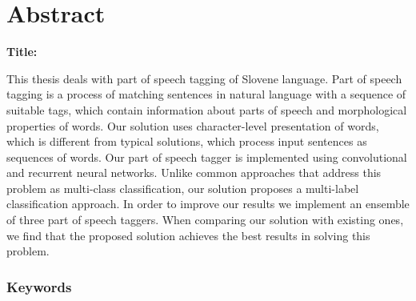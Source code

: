 \chapter*{Abstract}

\noindent\textbf{Title:} \ttitleEn
\bigskip

This thesis deals with part of speech tagging of Slovene language. Part of speech tagging is a process of matching sentences in natural language with a sequence of suitable tags, which contain information about parts of speech and morphological properties of words. Our solution uses character-level presentation of words, which is different from typical solutions, which process input sentences as sequences of words. Our part of speech tagger is implemented using convolutional and recurrent neural networks. Unlike common approaches that address this problem as multi-class classification, our solution proposes a multi-label classification approach. In order to improve our results we implement an ensemble of three part of speech taggers. When comparing our solution with existing ones, we find that the proposed solution achieves the best results in solving this problem.

\subsection*{Keywords}
\textit{\tkeywordsEn}
\clearemptydoublepage
